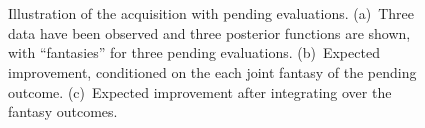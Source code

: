 \documentclass[aos,preprint]{imsart}
\begin{document}
\begin{figure}[t]
\begin{minipage}[t]{0.49\textwidth}
  \setcounter{subfigure}{0}
  \\
  \\
  \caption{{\small Illustration of the acquisition with pending
    evaluations. (a)~Three data have been observed and three posterior
    functions are shown, with ``fantasies'' for three pending
    evaluations.  (b)~Expected improvement, conditioned on the each
    joint fantasy of the pending outcome.  (c)~Expected improvement
    after integrating over the fantasy outcomes.}}
  \label{fig:illust-parallel}
  \end{minipage}
\end{figure}
\end{document}
